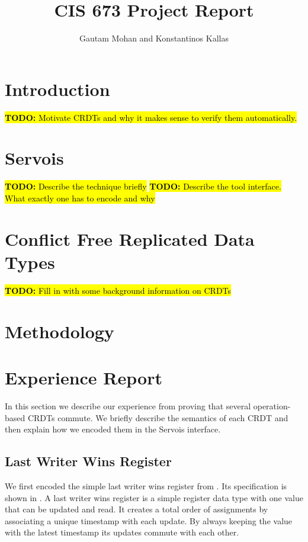 \documentclass{article}
\newcommand{\TODO}[1]{\hl{\textbf{TODO:} #1}\xspace}
\begin{document}
\title{CIS 673 Project Report}
\author{Gautam Mohan and Konstantinos Kallas}


\maketitle

\section{Introduction}

\TODO{Motivate CRDTs and why it makes sense to verify them
  automatically.}

\section{Servois}

\TODO{Describe the technique briefly} \TODO{Describe the tool
  interface. What exactly one has to encode and why}

\section{Conflict Free Replicated Data Types}

\TODO{Fill in with some background information on CRDTs}~\cite{shapiro2011conflict}

\section{Methodology}

\section{Experience Report}

In this section we describe our experience from proving that several
operation-based CRDTs commute. We briefly describe the semantics of
each CRDT and then explain how we encoded them in the Servois
interface.

\subsection{Last Writer Wins Register}

We first encoded the simple last writer wins register from
\cite{shapiro2011comprehensive}. Its specification is shown in
. A last writer wins register is a simple register
data type with one value that can be updated and read. It creates a
total order of assignments by associating a unique timestamp with each
update. By always keeping the value with the latest timestamp its
updates commute with each other.
\end{document}

